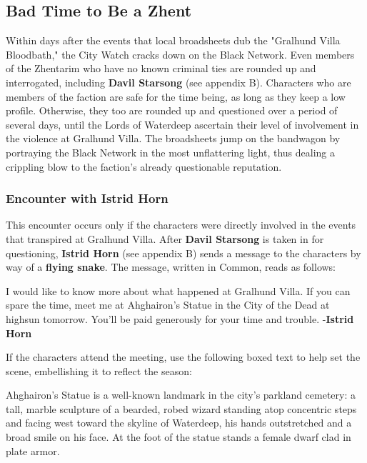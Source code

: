\documentclass[10pt,a4paper,twoside,twocolumn,openany,nodeprecatedcode]{dndbook}
\begin{document}
\subsection{Bad Time to Be a Zhent}
Within days after the events that local broadsheets dub the "Gralhund Villa Bloodbath," the City Watch cracks down on the Black Network. Even members of the Zhentarim who have no known criminal ties are rounded up and interrogated, including \textbf{Davil Starsong} (see appendix B). Characters who are members of the faction are safe for the time being, as long as they keep a low profile. Otherwise, they too are rounded up and questioned over a period of several days, until the Lords of Waterdeep ascertain their level of involvement in the violence at Gralhund Villa. The broadsheets jump on the bandwagon by portraying the Black Network in the most unflattering light, thus dealing a crippling blow to the faction's already questionable reputation.
\subsubsection{Encounter with Istrid Horn}
This encounter occurs only if the characters were directly involved in the events that transpired at Gralhund Villa. After \textbf{Davil Starsong} is taken in for questioning, \textbf{Istrid Horn} (see appendix B) sends a message to the characters by way of a \textbf{flying snake}. The message, written in Common, reads as follows:
\begin{DndReadAloud}{}
I would like to know more about what happened at Gralhund Villa. If you can spare the time, meet me at Ahghairon's Statue in the City of the Dead at highsun tomorrow. You'll be paid generously for your time and trouble.
-\textbf{Istrid Horn}
\end{DndReadAloud}

If the characters attend the meeting, use the following boxed text to help set the scene, embellishing it to reflect the season:
\begin{DndReadAloud}{}
Ahghairon's Statue is a well-known landmark in the city's parkland cemetery: a tall, marble sculpture of a bearded, robed wizard standing atop concentric steps and facing west toward the skyline of Waterdeep, his hands outstretched and a broad smile on his face. At the foot of the statue stands a female dwarf clad in plate armor.
\end{DndReadAloud}
\end{document}
